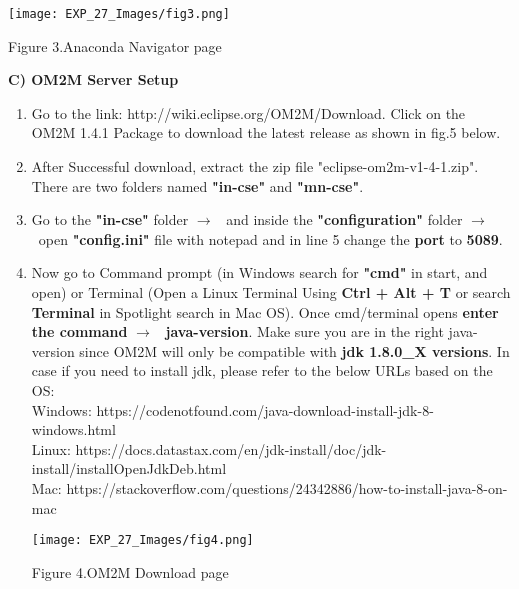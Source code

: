 \documentclass[12pt,a4paper]{article}
\begin{document}
\begin{justify}
\begin{enumerate}
    \vspace{-5mm}
\begin{center} 
\texttt{[image: EXP\_27\_Images/fig3.png]}
\end{center}
\vspace{-7mm}
\begin{center} {Figure 3.Anaconda Navigator page}\end{center}  
    
\end{enumerate}




\noindent \textbf{C)	OM2M Server Setup}
\vspace{-3mm}
\begin{enumerate}
    \item Go to the link: http://wiki.eclipse.org/OM2M/Download. Click on the OM2M 1.4.1 Package to download the latest release as shown in fig.5 below.
    
\item After Successful download, extract the zip file "eclipse-om2m-v1-4-1.zip". There are two folders named \textbf{"in-cse"} and \textbf{"mn-cse"}.

\item Go to the \textbf{"in-cse"} folder $ \rightarrow $ \ and inside the \textbf{"configuration"} folder $ \rightarrow $ \ open \textbf{"config.ini"} file with notepad and in line 5 change the \textbf{port} to \textbf{5089}.

\item Now go to Command prompt (in Windows search for \textbf{"cmd"} in start, and open) or Terminal (Open a Linux Terminal Using \textbf{Ctrl + Alt + T }or search \textbf{Terminal} in Spotlight search in Mac OS). Once cmd/terminal opens \textbf{enter the command} $ \rightarrow $ \ \textbf{java-version}. Make sure you are in the right java-version since OM2M will only be compatible with \textbf{jdk 1.8.0\_X versions}. In case if you need to install jdk,  please refer to the below URLs based on the OS: \\[4pt]

Windows: https://codenotfound.com/java-download-install-jdk-8-windows.html \\[4pt]
Linux: https://docs.datastax.com/en/jdk-install/doc/jdk-install/installOpenJdkDeb.html \\[4pt]
Mac: https://stackoverflow.com/questions/24342886/how-to-install-java-8-on-mac

\begin{center} 
\texttt{[image: EXP\_27\_Images/fig4.png]}
\end{center}
\vspace{-9mm}
\begin{center} {Figure 4.OM2M Download page}\end{center}  


\end{enumerate}
\end{justify}
\end{document}
